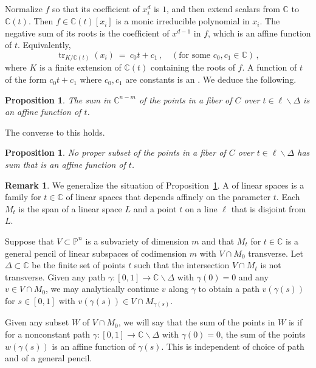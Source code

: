 \documentclass[12pt]{amsart}
\newtheorem{proposition}[theorem]{Proposition}
\theoremstyle{definition}
\newtheorem{remark}[theorem]{Remark}
\begin{document}
Normalize $f$ so that its coefficient of $x_i^d$ is $1$, and then
extend scalars from ${{\mathbb{C}}}$ to ${{\mathbb{C}}}(t)$.
Then $f\in {{\mathbb{C}}}(t)[x_i]$ is a monic irreducible polynomial in $x_i$.
The negative sum of its roots is the coefficient of $x^{d-1}$ in $f$, which is an affine function
of $t$.
Equivalently,
 \[
   \operatorname{tr}_{K/{{\mathbb{C}}}(t)}(x_i)\ =\ c_0 t+c_1\,, \quad(\mbox{for some }c_0,c_1\in {{\mathbb{C}}})\,,
 \]
where $K$ is a finite extension of ${{\mathbb{C}}}(t)$ containing the roots of $f$.
A function of $t$ of the form $c_0 t+c_1$ where $c_0,c_1$ are constants is an
{{{}}}.
We deduce the following.

\begin{proposition}\label{Prop:one}
 The sum in ${{\mathbb{C}}}^{n-m}$ of the points in a fiber of $C$ over $t\in\ell\smallsetminus\Delta$ is an affine
 function of $t$.
\end{proposition}

The converse to this holds.

\begin{proposition}\label{Prop:two}
 No proper subset of the points in a fiber of $C$ over $t\in\ell\smallsetminus\Delta$ has sum that is an affine
 function of $t$.
\end{proposition}

\begin{remark}
 We generalize the situation of Proposition~\ref{Prop:two}.
 A {{{}}} of linear spaces is a family {{\color{blue}{$M_t$}}} for $t\in{{\mathbb{C}}}$ of linear spaces that depends
 affinely on the parameter $t$.
 Each $M_t$ is the span of a linear space $L$ and a point $t$ on a line $\ell$ that is disjoint from $L$.

 Suppose that $V\subset{{\mathbb{P}}}^n$ is a subvariety of dimension $m$ and that $M_t$ for $t\in{{\mathbb{C}}}$ is a general pencil of
 linear subspaces of codimension $m$ with $V\cap M_0$ transverse.
 Let $\Delta\subset{{\mathbb{C}}}$ be the finite set of points $t$ such that the intersection $V\cap M_t$ is not transverse.
 Given any path $\gamma\colon[0,1]\to{{\mathbb{C}}}\smallsetminus\Delta$ with $\gamma(0)=0$ and any $v\in V\cap
 M_0$, we may analytically continue $v$ along $\gamma$ to obtain a path $v(\gamma(s))$ for $s\in[0,1]$
 with $v(\gamma(s))\in V\cap M_{\gamma(s)}$.

 Given any subset $W$ of $V\cap M_0$, we will say that the sum of the points in $W$ is
 {{{}}} if for a nonconstant path $\gamma\colon[0,1]\to{{\mathbb{C}}}\smallsetminus\Delta$ with
 $\gamma(0)=0$, the sum of the points $w(\gamma(s))$ is an affine function of $\gamma(s)$.
 This is independent of choice of path and of a general pencil.
\end{remark}
\end{document}
